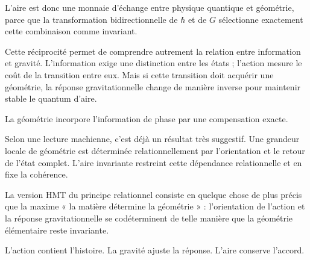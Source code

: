 L’aire est donc une monnaie d’échange entre physique quantique et géométrie, parce que la transformation bidirectionnelle de \(\hbar\) et de \(G\) sélectionne exactement cette combinaison comme invariant.\par

Cette réciprocité permet de comprendre autrement la relation entre information et gravité. L’information exige une distinction entre les états ; l’action mesure le coût de la transition entre eux. Mais si cette transition doit acquérir une géométrie, la réponse gravitationnelle change de manière inverse pour maintenir stable le quantum d’aire.\par

La géométrie incorpore l’information de phase par une compensation exacte.\par

Selon une lecture machienne, c’est déjà un résultat très suggestif. Une grandeur locale de géométrie est déterminée relationnellement par l’orientation et le retour de l’état complet. L’aire invariante restreint cette dépendance relationnelle et en fixe la cohérence.\par

La version HMT du principe relationnel consiste en quelque chose de plus précis que la maxime « la matière détermine la géométrie » : l’orientation de l’action et la réponse gravitationnelle se codéterminent de telle manière que la géométrie élémentaire reste invariante.\par

L’action contient l’histoire. La gravité ajuste la réponse. L’aire conserve l’accord.\par

